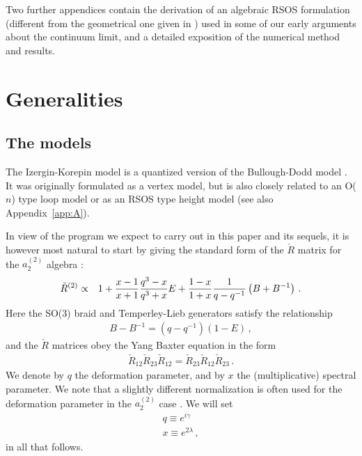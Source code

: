 \documentclass[11pt]{article}
\begin{document}
Two further appendices contain the derivation of an  algebraic RSOS formulation (different from the geometrical one given in \cite{NienhuisRSOS})  used in some of our early arguments about the continuum limit, and a detailed exposition of the numerical method and results.
 
\section{Generalities}\label{Sec:gen}

\subsection{The models}
\label{sec:models}

The Izergin-Korepin model \cite{IzergKorep} is a quantized version of the Bullough-Dodd model \cite{BullDodd}.
It was originally \cite{IzergKorep} formulated as a vertex model, but is also closely related to  an O($n$) type
loop model \cite{Nienhuis90,BloteNienhuis89,Nienhuis,Batchelor} or as an RSOS type height model \cite{NienhuisRSOS} (see also Appendix~\ref{app:A}).

In view of the program we expect to carry out in this  paper and its sequels, it is however most natural to start by giving the standard form of the $\check{R}$ matrix for the $a_2^{(2)}$ algebra \cite{GM2}:
%
\begin{eqnarray}
\check{R}^{(2)}&\propto &1+{x-1\over x+1}{q^{3}-x\over q^{3}+x}E+{1-x\over 1+x}{1\over q-q^{-1}}\left(B+B^{-1}\right) \,.\label{IKRmat}
\end{eqnarray}
%
Here the SO($3$) braid and Temperley-Lieb generators satisfy the relationship
%
\begin{eqnarray}
 B - B^{-1} = (q-q^{-1}) (1 - E) \,,
\end{eqnarray}
%
and the $\check{R}$ matrices obey the Yang Baxter equation in the form
%
\begin{eqnarray}
 \check{R}_{12}\check{R}_{23}\check{R}_{12}=\check{R}_{23}\check{R}_{12}\check{R}_{23} \,.
\end{eqnarray}
%
We denote by $q$ the deformation parameter, and by $x$ the (multiplicative) spectral parameter. We note that a slightly different normalization is often used for the deformation parameter in the $a_2^{(2)}$ case \cite{Takacs}. We will set 
%
\begin{eqnarray}
q \equiv e^{i\gamma}\nonumber\\
x \equiv e^{2\lambda} \,,
\label{ourparameters}
\end{eqnarray}
%
in all that follows. 
\end{document}
